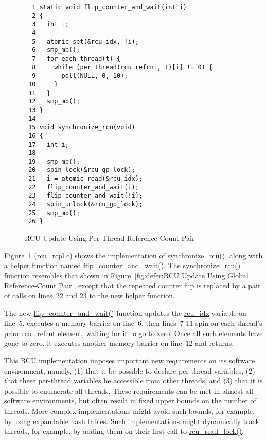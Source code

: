 \begin{figure}[tbp]
{ \scriptsize
\begin{verbatim}
  1 static void flip_counter_and_wait(int i)
  2 {
  3   int t;
  4 
  5   atomic_set(&rcu_idx, !i);
  6   smp_mb();
  7   for_each_thread(t) {
  8     while (per_thread(rcu_refcnt, t)[i] != 0) {
  9       poll(NULL, 0, 10);
 10     }
 11   }
 12   smp_mb();
 13 }
 14 
 15 void synchronize_rcu(void)
 16 {
 17   int i;
 18 
 19   smp_mb();
 20   spin_lock(&rcu_gp_lock);
 21   i = atomic_read(&rcu_idx);
 22   flip_counter_and_wait(i);
 23   flip_counter_and_wait(!i);
 24   spin_unlock(&rcu_gp_lock);
 25   smp_mb();
 26 }
\end{verbatim}
}
\caption{RCU Update Using Per-Thread Reference-Count Pair}
\label{fig:defer:RCU Update Using Per-Thread Reference-Count Pair}
\end{figure}

Figure~\ref{fig:defer:RCU Update Using Per-Thread Reference-Count Pair}
(\url{rcu_rcpl.c})
shows the implementation of \url{synchronize_rcu()}, along with a helper
function named \url{flip_counter_and_wait()}.
The \url{synchronize_rcu()} function resembles that shown in
Figure~\ref{fig:defer:RCU Update Using Global Reference-Count Pair},
except that the repeated counter flip is replaced by a pair of calls
on lines~22 and 23 to the new helper function.

The new \url{flip_counter_and_wait()} function updates the
\url{rcu_idx} variable on line~5, executes a memory barrier on line~6,
then lines~7-11 spin on each thread's prior \url{rcu_refcnt} element,
waiting for it to go to zero.
Once all such elements have gone to zero,
it executes another memory barrier on line~12 and returns.

This RCU implementation imposes important new requirements on its
software environment, namely, (1) that it be possible to declare
per-thread variables, (2) that these per-thread variables be accessible
from other threads, and (3) that it is possible to enumerate all threads.
These requirements can be met in almost all software environments,
but often result in fixed upper bounds on the number of threads.
More-complex implementations might avoid such bounds, for example, by using
expandable hash tables.
Such implementations might dynamically track threads, for example, by
adding them on their first call to \url{rcu_read_lock()}.


